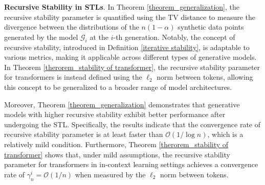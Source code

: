 \begin{remark}\textbf{Recursive Stability in STLs}. 
In Theorem \ref{theorem_generalization}, the recursive stability parameter is quantified using the TV distance to measure the divergence between the distributions of the $n(1-\alpha)$ synthetic data points generated by the model $\mathcal{G}_i$ at the $i$-th generation. Notably, the concept of recursive stability, introduced in Definition \ref{iterative stability}, is adaptable to various metrics, making it applicable across different types of generative models. In Theorem \ref{therorem_stability of transformer}, the recursive stability parameter for transformers is instead defined using the $\ell_2$ norm between tokens, allowing this concept to be generalized to a broader range of model architectures.

Moreover, Theorem \ref{theorem_generalization} demonstrates that generative models with higher recursive stability exhibit better performance after undergoing the STL. Specifically, the results indicate that the convergence rate of recursive stability parameter is at least faster than $\mathcal{O}(1 / \log n)$, which is a relatively mild condition. Furthermore, Theorem \ref{therorem_stability of transformer} shows that, under mild assumptions, the recursive stability parameter for transformers in in-context learning settings achieves a convergence rate of $\gamma_n^i = \mathcal{O}(1 / n)$ when measured by the $\ell_2$ norm between tokens.






\end{remark}
